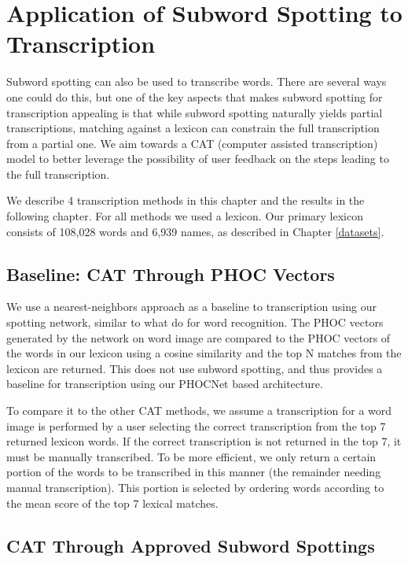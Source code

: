 \documentclass[ms,electronic,twosidetoc,letterpaper,chaptercenter,parttop,lof,lot]{byumsphd}
\begin{document}
\chapter{Application of Subword Spotting to Transcription}\label{transcription}

Subword spotting can also be used to transcribe words. There are several ways one could do this, but one of the key aspects that makes subword spotting for transcription appealing is that while subword spotting naturally yields partial transcriptions, matching against a lexicon can constrain the full transcription from a partial one. We aim towards a CAT (computer assisted transcription) model to better leverage the possibility of user feedback on the steps leading to the full transcription.

We describe 4 transcription methods in this chapter and the results in the following chapter.
For all methods we used a lexicon. Our primary lexicon consists of 108,028 words and 6,939 names, as described in Chapter \ref{datasets}.

\section{Baseline: CAT Through PHOC Vectors}
We use a nearest-neighbors approach as a baseline to transcription using our spotting network, similar to what \cite{krishnan2016} do for word recognition. The PHOC vectors generated by the network on word image are compared to the PHOC vectors of the  words in our lexicon using a cosine similarity and the top N matches from the lexicon are returned. This does not use subword spotting, and thus provides a baseline for transcription using our PHOCNet based architecture.

To compare it to the other CAT methods, we assume a transcription for a word image is performed by a user selecting the correct transcription from the top 7 returned lexicon words. If the correct transcription is not returned in the top 7, it must be manually transcribed.
To be more efficient, we only return a certain portion of the words to be transcribed in this manner (the remainder needing manual transcription). This portion is selected by ordering words according to the mean score of the top 7 lexical matches.







\section{CAT Through Approved Subword Spottings}
\end{document}
